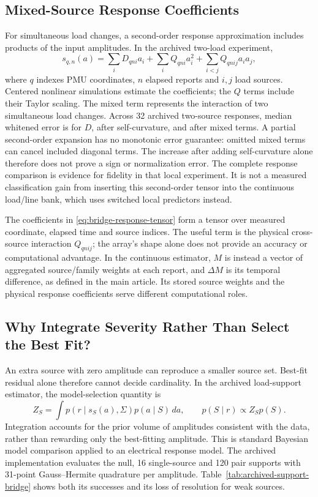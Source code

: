 \subsection{Mixed-Source Response Coefficients}
For simultaneous load changes, a second-order response approximation
includes products of the input amplitudes. In the archived two-load
experiment,
\begin{equation}
 s_{q,n}(a)=\sum_i D_{qni}a_i+\sum_i Q_{qni}a_i^2
               +\sum_{i<j}Q_{qnij}a_ia_j,
 \label{eq:bridge-response-tensor}
\end{equation}
where $q$ indexes PMU coordinates, $n$ elapsed reports and $i,j$ load
sources. Centered nonlinear simulations estimate the coefficients; the
$Q$ terms include their Taylor scaling. The mixed term represents the
interaction of two simultaneous load changes. Across 32 archived
two-source responses, median whitened error is \BridgeDError{} for $D$,
\BridgeQError{} after self-curvature, and \BridgeMixedError{} after mixed
terms. A partial second-order expansion has no monotonic error guarantee:
omitted mixed terms can cancel included diagonal terms. The increase
after adding self-curvature alone therefore does not prove a sign or
normalization error. The complete response comparison is evidence for
fidelity in that local experiment.
It is not a measured classification gain from inserting this second-order
tensor into the continuous load/line bank, which uses switched local
predictors instead.

The coefficients in \eqref{eq:bridge-response-tensor} form a tensor over
measured coordinate, elapsed time and source indices. The useful term is
the physical cross-source interaction $Q_{qnij}$; the array's shape alone
does not provide an accuracy or computational advantage.
In the continuous estimator, $M$ is instead a vector of aggregated
source/family weights at each report, and $\Delta M$ is its temporal
difference, as defined in the main article.
Its stored source weights and the physical response coefficients serve
different computational roles.

\subsection{Why Integrate Severity Rather Than Select the Best Fit?}
An extra source with zero amplitude can reproduce a smaller source set.
Best-fit residual alone therefore cannot decide cardinality. In the
archived load-support estimator, the model-selection quantity is
\begin{equation}
 Z_S=\int p(r\mid s_S(a),\Sigma)p(a\mid S)\,da,
 \qquad p(S\mid r)\propto Z_Sp(S).
 \label{eq:bridge-batch-evidence}
\end{equation}
Integration accounts for the prior volume of amplitudes consistent with
the data, rather than rewarding only the best-fitting amplitude. This is
standard Bayesian model comparison applied to an electrical response
model. The archived implementation evaluates the
null, 16 single-source and 120 pair supports with 31-point Gauss--Hermite
quadrature per amplitude. Table~\ref{tab:archived-support-bridge} shows
both its successes and its loss of resolution for weak sources.

